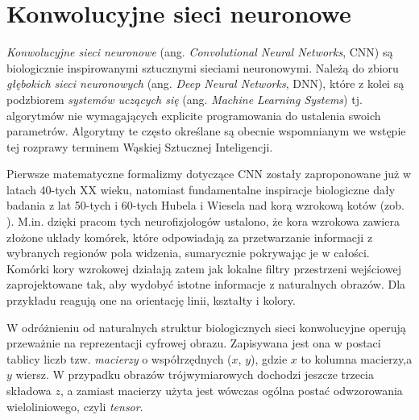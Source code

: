 \chapter{Konwolucyjne sieci neuronowe}
\label{CNNs}
\textit{Konwolucyjne sieci neuronowe} (ang. \textit{Convolutional Neural Networks}, CNN) \linebreak są biologicznie inspirowanymi sztucznymi sieciami neuronowymi. Należą do zbioru \textit{głębokich sieci neuronowych} (ang. \textit{Deep Neural Networks}, DNN), które z kolei są podzbiorem \textit{systemów uczących się} (ang. \textit{Machine Learning Systems}) tj. algorytmów nie wymagających explicite programowania do ustalenia swoich parametrów. Algorytmy te często określane są obecnie wspomnianym we wstępie tej rozprawy terminem Wąskiej Sztucznej Inteligencji.

Pierwsze matematyczne formalizmy dotyczące CNN zostały zaproponowane już w latach 40-tych XX wieku, natomiast fundamentalne inspiracje biologiczne dały badania z lat 50-tych i 60-tych Hubela i Wiesela nad korą wzrokową kotów (zob. \cite{Wurtz2009}). M.in. dzięki pracom tych neurofizjologów ustalono, że kora wzrokowa zawiera złożone układy komórek, które odpowiadają za przetwarzanie informacji \linebreak z wybranych regionów pola widzenia, sumarycznie pokrywając je w całości. Komórki kory wzrokowej działają zatem jak lokalne filtry przestrzeni wejściowej zaprojektowane tak, aby wydobyć istotne informacje z naturalnych obrazów. Dla przykładu reagują one na orientację linii, kształty i kolory.

W odróżnieniu od naturalnych struktur biologicznych sieci konwolucyjne operują przeważnie na reprezentacji cyfrowej obrazu. Zapisywana jest ona w postaci tablicy liczb tzw. \textit{macierzy} o współrzędnych ($x$, $y$), gdzie $x$ to kolumna macierzy,\linebreak a $y$ wiersz. W przypadku obrazów trójwymiarowych dochodzi jeszcze trzecia składowa $z$, a zamiast macierzy użyta jest wówczas ogólna postać odwzorowania wieloliniowego, czyli \textit{tensor}.

